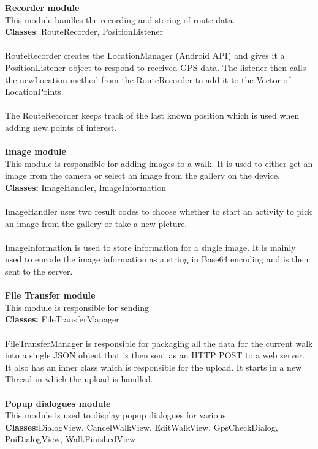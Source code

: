 \documentclass[12pt]{article}
\begin{document}
\textbf{Recorder module}~\\
This module handles the recording and storing of route data.~\\
\textbf{Classes}: RouteRecorder, PositionListener~\\\\
RouteRecorder creates the LocationManager (Android API) and gives it a PositionListener object to respond to received GPS data. The listener then calls the newLocation method from the RouteRecorder to add it to the Vector of LocationPoints.~\\\\
The RouteRecorder keeps track of the last known position which is used when adding new points of interest. 
~\\\\
\textbf{Image module}~\\
This module is responsible for adding images to a walk. It is used to either get an image from the camera or select an image from the gallery on the device. ~\\
\textbf{Classes:} ImageHandler, ImageInformation
~\\\\ImageHandler uses two result codes to choose whether to start an activity to pick an image from the gallery or take a new picture.~\\\\
ImageInformation is used to store information for a single image. It is mainly used to encode the image information as a string in Base64 encoding and is then sent to the server.~\\\\
\textbf{File Transfer module}~\\
This module is responsible for sending~\\
\textbf{Classes:} FileTransferManager ~\\\\
FileTransferManager is responsible for packaging all the data for the current walk into a single JSON object that is then sent as an HTTP POST to a web server. It also has an inner class which is responsible for the upload. It starts in a new Thread in which the upload is handled.~\\\\
\textbf{Popup dialogues module}~\\
This module is used to display popup dialogues for various.~\\ 
\textbf{Classes:}DialogView, CancelWalkView, EditWalkView, GpsCheckDialog, PoiDialogView, WalkFinishedView~\\
\end{document}
